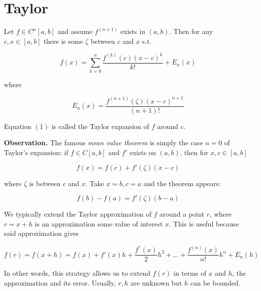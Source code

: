 \documentclass[12pt]{article}
\theoremstyle{definition}
\begin{document}
\section{Taylor}

Let $f \in C^n[a, b]$ and assume $f^{(n+1)}$ exists in $(a, b)$. Then 
for any $c, x \in [a, b]$ there is some $\zeta$ between $c$ and $x$ s.t. 

\begin{equation}
f(x) = \sum_{k=0}^{n} \frac{f^{(k)}(c)(x-c)^k}{k!} + E_n(x)
\end{equation}

where 

\begin{equation*}
    E_n(x) = \frac{f^{(n+1)}(\zeta)(x-c)^{n+1}}{(n+1)!}
\end{equation*}

Equation $(1)$ is called the Taylor expansion of $f$ around $c$. 

\begin{shaded}
    \textbf{Observation.} The famous \textit{mean value theorem} is simply the
    case $n = 0$ of Taylor's expansion: if $f \in C[a, b]$ and $f'$ exists on
    $(a, b)$, then for $x, c \in [a, b]$

    \begin{equation*}
        f(x) = f(c) + f'(\zeta)(x-c)
    \end{equation*}

    where $\zeta$ is between $c$ and $x$. Take $x=b, c = a$ and the theorem
    appears:

    \begin{equation*}
        f(b) - f(a) = f'(\zeta)(b-a)
    \end{equation*}
\end{shaded}

We typically extend the Taylor approximation of $f$ around a point $r$, where
$r = x + h$ is an approximation some value of interest $x$. This is useful
because said approximation gives 

\begin{equation*}
    f(r) = f(x+h) = f(x) + f'(x)h + \frac{ f^{''}(x) }{2}h^2 + \ldots + 
    \frac{ f^{(n)}(x) }{n!}h^n + E_n(h)
\end{equation*}

In other words, this strategy allows us to extend $f(r)$ in terms of $x$ and
$h$, the approximation and its error. Usually, $r, h$ are unknown but $h$ can be
bounded.

\pagebreak
\end{document}
